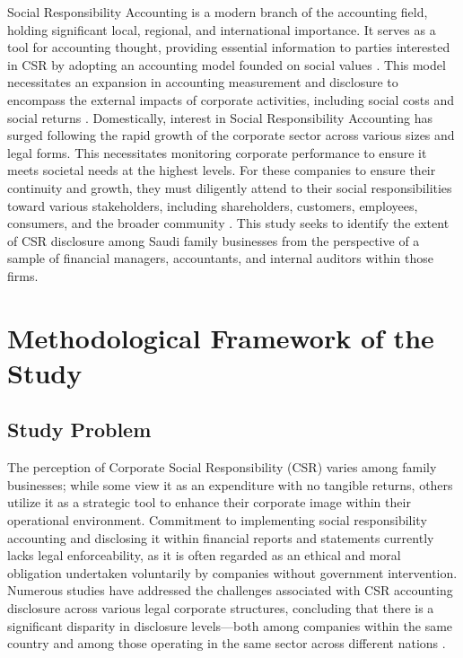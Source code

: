 \documentclass[10pt]{NSP1}
\begin{document}
	Social Responsibility Accounting is a modern branch of the accounting field, holding significant local, regional, and international importance. It serves as a tool for accounting thought, providing essential information to parties interested in CSR by adopting an accounting model founded on social values \cite{AbdelHaq2022}. This model necessitates an expansion in accounting measurement and disclosure to encompass the external impacts of corporate activities, including social costs and social returns \cite{Tarshi2017}. Domestically, interest in Social Responsibility Accounting has surged following the rapid growth of the corporate sector across various sizes and legal forms. This necessitates monitoring corporate performance to ensure it meets societal needs at the highest levels. For these companies to ensure their continuity and growth, they must diligently attend to their social responsibilities toward various stakeholders, including shareholders, customers, employees, consumers, and the broader community \cite{Habbash2018}. This study seeks to identify the extent of CSR disclosure among Saudi family businesses from the perspective of a sample of financial managers, accountants, and internal auditors within those firms.
	
	\section{Methodological Framework of the Study}
	
	\subsection{Study Problem}
	
	The perception of Corporate Social Responsibility (CSR) varies among family businesses; while some view it as an expenditure with no tangible returns, others utilize it as a strategic tool to enhance their corporate image within their operational environment. Commitment to implementing social responsibility accounting and disclosing it within financial reports and statements currently lacks legal enforceability, as it is often regarded as an ethical and moral obligation undertaken voluntarily by companies without government intervention. Numerous studies have addressed the challenges associated with CSR accounting disclosure across various legal corporate structures, concluding that there is a significant disparity in disclosure levels—both among companies within the same country and among those operating in the same sector across different nations \cite{Hussainey2011}.
	
\end{document}
